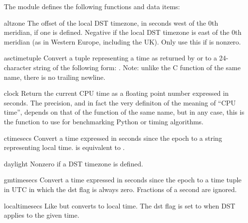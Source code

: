 \begin{itemize}
\end{itemize}

The module defines the following functions and data items:


\begin{datadesc}{altzone}
The offset of the local DST timezone, in seconds west of the 0th
meridian, if one is defined.  Negative if the local DST timezone is
east of the 0th meridian (as in Western Europe, including the UK).
Only use this if  is nonzero.
\end{datadesc}

\begin{funcdesc}{asctime}{tuple}
Convert a tuple representing a time as returned by  or
 to a 24-character string of the following form:
.  Note: unlike the C function of
the same name, there is no trailing newline.
\end{funcdesc}

\begin{funcdesc}{clock}{}
Return the current CPU time as a floating point number expressed in
seconds.  The precision, and in fact the very definiton of the meaning
of ``CPU time'', depends on that of the \C{} function
of the same name, but in any case, this is the function to use for
benchmarking Python or timing algorithms.
\end{funcdesc}

\begin{funcdesc}{ctime}{secs}
Convert a time expressed in seconds since the epoch to a string
representing local time.   is equivalent to
.
\end{funcdesc}

\begin{datadesc}{daylight}
Nonzero if a DST timezone is defined.
\end{datadesc}

\begin{funcdesc}{gmtime}{secs}
Convert a time expressed in seconds since the epoch to a time tuple
in UTC in which the dst flag is always zero.  Fractions of a second are
ignored.
\end{funcdesc}

\begin{funcdesc}{localtime}{secs}
Like  but converts to local time.  The dst flag is
set to  when DST applies to the given time.
\end{funcdesc}

